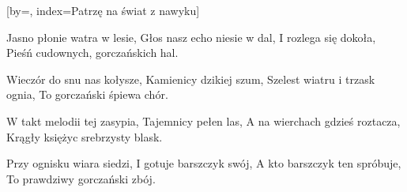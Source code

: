 [by={},
                     index={Patrzę na świat z nawyku}]
\beginverse

Jasno płonie watra w lesie,
Głos nasz echo niesie w dal,
I rozlega się dokoła,
Pieśń cudownych, gorczańskich hal.

\endverse
\beginverse

Wieczór do snu nas kołysze,
Kamienicy dzikiej szum,
Szelest wiatru i trzask ognia,
To gorczański śpiewa chór.

\endverse
\beginverse

W takt melodii tej zasypia,
Tajemnicy pełen las,
A na wierchach gdzieś roztacza,
Krągły księżyc srebrzysty blask.

\endverse
\beginverse

Przy ognisku wiara siedzi,
I gotuje barszczyk swój,
A kto barszczyk ten spróbuje,
To prawdziwy gorczański zbój.

\endverse
\endsong
